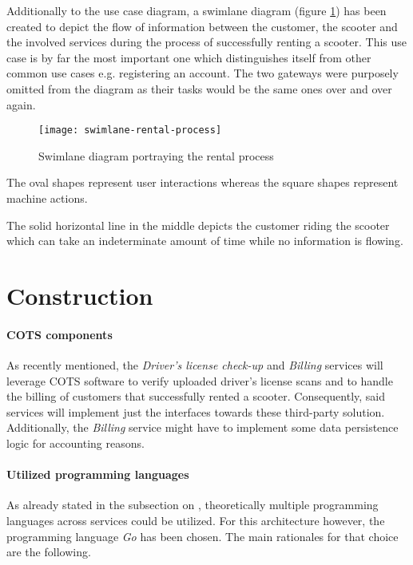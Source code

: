 \documentclass[12pt,a4paper]{report}
\begin{document}
Additionally to the use case diagram, a swimlane diagram
(figure \ref{fig:swimlane-rental-process}) has been created to depict
the flow of information between the customer, the scooter and the
involved services during the process of successfully renting a scooter.
This use case is by far the most important one which distinguishes itself
from other common use cases e.g. registering an account.
The two gateways were purposely omitted from the diagram as their tasks would
be the same ones over and over again.

\begin{figure}[htbp]
\centering
\texttt{[image: swimlane-rental-process]}
\caption{Swimlane diagram portraying the rental process}
\label{fig:swimlane-rental-process}
\end{figure}

The oval shapes represent user interactions whereas the square shapes represent
machine actions.

The solid horizontal line in the middle depicts the customer riding the scooter
which can take an indeterminate amount of time while no information is flowing.


\section{Construction} \label{subsect:analysis-construction}

\paragraph{COTS components}
As recently mentioned, the \textit{Driver's license check-up} and \textit{Billing}
services will leverage COTS software to verify uploaded driver's license scans
and to handle the billing of customers that successfully rented a scooter.
Consequently, said services will implement just the interfaces towards these
third-party solution. Additionally, the \textit{Billing} service might have
to implement some data persistence logic for accounting reasons.

\paragraph{Utilized programming languages}
As already stated in the subsection on \textit{},
theoretically multiple programming languages across services could be utilized.
For this architecture however, the programming language \textit{Go} has been chosen.
The main rationales for that choice are the following.
\end{document}
